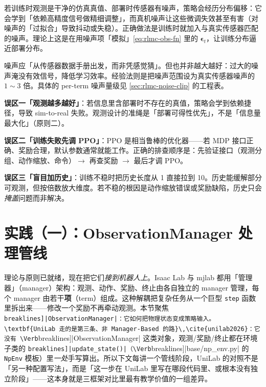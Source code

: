 若训练时观测是干净的仿真真值、部署时传感器有噪声，策略会经历分布偏移：它会学到「依赖高精度信号做精细调整」，而真机噪声让这些微调失效甚至有害（对噪声的「过拟合」导致抖动或失稳）。正确做法是训练时就加入与真实传感器匹配的噪声。理论上这是在用噪声项「模拟」\cref{eq:rlmc-obs-fn} 里的 $\boldsymbol\epsilon_t$，让训练分布逼近部署分布。

噪声应「从传感器数据手册出发，而非凭感觉猜」。但也并非越大越好：过大的噪声淹没有效信号，降低学习效率。经验法则是把噪声范围设为真实传感器噪声的 $1\!\sim\!3$ 倍。具体的 per-term 噪声量级见 \cref{sec:rlmc-noise-clip} 的工程表。

\begin{pitfall}[三个常见认知误区]
\textbf{误区一「观测越多越好」}：若信息里含部署时不存在的真值，策略会学到依赖捷径，导致 sim-to-real 失败。观测设计的准绳是「部署可得性优先」，不是「信息量最大化」（原则二）。

\textbf{误区二「训练失败先调 PPO」}：PPO 是相当鲁棒的优化器——若 MDP 接口正确、奖励合理，默认参数通常就能工作。正确的排查顺序是：先验证接口（观测分组、动作缩放、命令）$\to$ 再查奖励 $\to$ 最后才调 PPO。

\textbf{误区三「盲目加历史」}：训练不稳时把历史长度从 1 直接拉到 10。历史能缓解部分可观测，但按倍数放大维度。若不稳的根因是动作缩放错误或奖励缺陷，历史只会\emph{掩盖}问题而非解决。
\end{pitfall}

\section{实践（一）：ObservationManager 处理管线}
\label{sec:rlmc-pipeline}

理论与原则已就绪，现在把它们\emph{接到机器人上}。Isaac Lab 与 mjlab 都用「管理器」（manager）架构：观测、动作、奖励、终止由各自独立的 manager 管理，每个 manager 由若干\textbf{项}（term）组成。这种解耦把复杂任务从一个巨型 \verb|step| 函数里拆出来——修改一个奖励不再牵动观测。本节聚焦 \Verb[breaklines]|ObservationManager|：它如何把物理状态变成策略输入。\textbf{UniLab 走的是第三条、非 Manager-Based 的路}\,\cite{unilab2026}：它没有 \Verb[breaklines]|ObservationManager| 这类对象，观测/奖励/终止都在环境子类的 \Verb[breaklines]|update_state()|（\Verb[breaklines]|base/np_env.py| 的 \verb|NpEnv| 模板）里\emph{一处}手写算出。所以下文每讲一个管线阶段，UniLab 的对照不是「另一种配置写法」，而是「这一步在 UniLab 里写在哪段代码里、或根本没有独立阶段」——这本身就是三框架对比里最有教学价值的一组差异。

